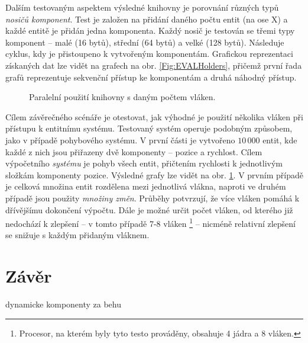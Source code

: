 Dalším testovaným aspektem výsledné knihovny je porovnání různých typů \emph{nosičů komponent}. Test je založen na přidání daného počtu entit (na ose X) a každé entitě je přidán jedna komponenta. Každý nosič je testován se třemi typy komponent -- malé (16 bytů), střední (64 bytů) a velké (128 bytů). Následuje cyklus, kdy je přistoupeno k vytvořeným komponentám. Grafickou reprezentaci získaných dat lze vidět na grafech na obr. \ref{Fig:EVALHolders}, přičemž první řada grafů reprezentuje sekvenční přístup ke komponentám a druhá náhodný přístup. 

\begin{figure}[H]
	\begin{center}
	\end{center}
	\caption{Paralelní použití knihovny s daným počtem vláken.}
	\label{Fig:EVALPar}
\end{figure}

Cílem závěrečného scénáře je otestovat, jak výhodné je použití několika vláken při přístupu k entitnímu systému. Testovaný systém operuje podobným způsobem, jako v případě pohybového systému. V první části je vytvořeno $10\,000$ entit, kde každé z nich jsou přiřazeny dvě komponenty -- pozice a rychlost. Cílem výpočetního \emph{systému} je pohyb všech entit, přičtením rychlosti k jednotlivým složkám komponenty pozice. Výsledné grafy lze vidět na obr. \ref{Fig:EVALPar}. V prvním případě je celková množina entit rozdělena mezi jednotlivá vlákna, naproti ve druhém případě jsou použity \emph{množiny změn}. Průběhy potvrzují, že více vláken pomáhá k dřívějšímu dokončení výpočtu. Dále je možné určit počet vláken, od kterého již nedochází k zlepšení -- v tomto případě 7-8 vláken \footnote{Procesor, na kterém byly tyto testo prováděny, obsahuje 4 jádra a 8 vláken.} -- nicméně relativní zlepšení se snižuje s každým přidaným vláknem.

\chapter{Závěr}
\blind[1]
\blind[1]
\blind[1]
\blind[1]
\blind[1]
dynamicke komponenty za behu



